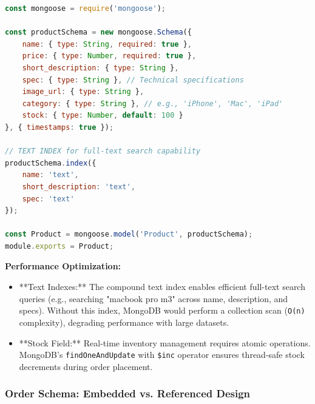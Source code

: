 \begin{lstlisting}[language=JavaScript, caption=Product Schema with Search Optimization (model/Product.js)]
const mongoose = require('mongoose');

const productSchema = new mongoose.Schema({
    name: { type: String, required: true },
    price: { type: Number, required: true },
    short_description: { type: String },
    spec: { type: String }, // Technical specifications
    image_url: { type: String },
    category: { type: String }, // e.g., 'iPhone', 'Mac', 'iPad'
    stock: { type: Number, default: 100 }
}, { timestamps: true });

// TEXT INDEX for full-text search capability
productSchema.index({
    name: 'text',
    short_description: 'text',
    spec: 'text'
});

const Product = mongoose.model('Product', productSchema);
module.exports = Product;
\end{lstlisting}

\textbf{Performance Optimization:}
\begin{itemize}
    \item **Text Indexes:** The compound text index enables efficient full-text search queries (e.g., searching "macbook pro m3" across name, description, and specs). Without this index, MongoDB would perform a collection scan (\texttt{O(n)} complexity), degrading performance with large datasets.
    \item **Stock Field:** Real-time inventory management requires atomic operations. MongoDB's \texttt{findOneAndUpdate} with \texttt{\$inc} operator ensures thread-safe stock decrements during order placement.
\end{itemize}

\subsubsection{Order Schema: Embedded vs. Referenced Design}

